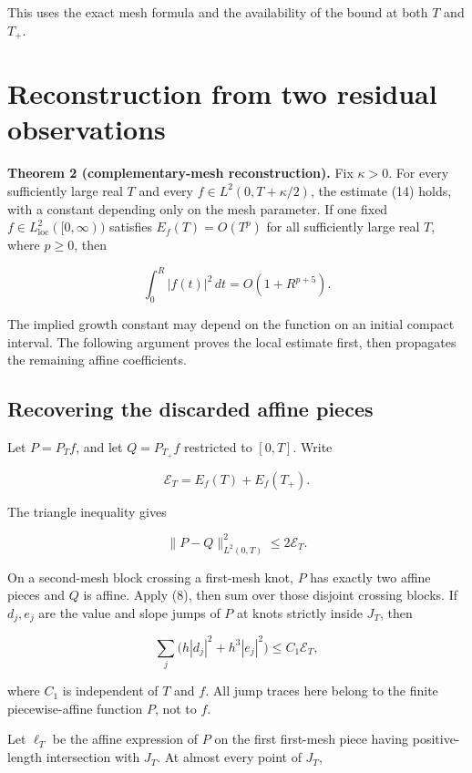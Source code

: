 \documentclass[
  11pt,
]{article}
\begin{document}
This uses the exact mesh formula and the availability of the bound at
both \(T\) and \(T_+\).

\hypertarget{reconstruction-from-two-residual-observations}{%
\section{Reconstruction from two residual
observations}\label{reconstruction-from-two-residual-observations}}

\textbf{Theorem 2 (complementary-mesh reconstruction).} Fix
\(\kappa>0\). For every sufficiently large real \(T\) and every
\(f\in L^2(0,T+\kappa/2)\), the estimate (14) holds, with a constant
depending only on the mesh parameter. If one fixed
\(f\in L^2_{\mathrm{loc}}([0,\infty))\) satisfies \(E_f(T)=O(T^p)\) for
all sufficiently large real \(T\), where \(p\ge0\), then

\[
\int_0^R |f(t)|^2\,dt=O(1+R^{p+5}).
\]

The implied growth constant may depend on the function on an initial
compact interval. The following argument proves the local estimate
first, then propagates the remaining affine coefficients.

\hypertarget{recovering-the-discarded-affine-pieces}{%
\subsection{Recovering the discarded affine
pieces}\label{recovering-the-discarded-affine-pieces}}

Let \(P=P_Tf\), and let \(Q=P_{T_+}f\) restricted to \([0,T]\). Write

\[
\mathcal E_T=E_f(T)+E_f(T_+).
\]

The triangle inequality gives

\[
\|P-Q\|_{L^2(0,T)}^2\le2\mathcal E_T. \tag{11}
\]

On a second-mesh block crossing a first-mesh knot, \(P\) has exactly two
affine pieces and \(Q\) is affine. Apply (8), then sum over those
disjoint crossing blocks. If \(d_j,e_j\) are the value and slope jumps
of \(P\) at knots strictly inside \(J_T\), then

\[
\sum_j\bigl(h|d_j|^2+h^3|e_j|^2\bigr)
\le C_1\mathcal E_T, \tag{12}
\]

where \(C_1\) is independent of \(T\) and \(f\). All jump traces here
belong to the finite piecewise-affine function \(P\), not to \(f\).

Let \(\ell_T\) be the affine expression of \(P\) on the first first-mesh
piece having positive-length intersection with \(J_T\). At almost every
point of \(J_T\),
\end{document}
